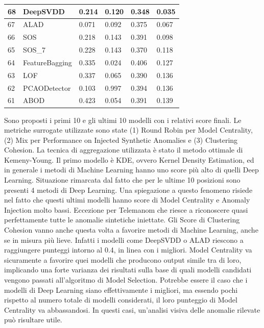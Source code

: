 \begin{table}[H]
\begin{minipage}{.5\textwidth}
{\begin{tabular}{|l|l|l|l|l|l|}
				\hline
				68          & DeepSVDD       & 0.214       & 0.120        & 0.348       & 0.035            \\ 
				\hline
				67          & ALAD           & 0.071       & 0.092        & 0.375       & 0.067            \\ 
				\hline
				66          & SOS            & 0.218       & 0.143        & 0.391       & 0.098            \\ 
				\hline
				65          & SOS\_7         & 0.228       & 0.143        & 0.370       & 0.118            \\ 
				\hline
				64          & FeatureBagging & 0.335       & 0.024        & 0.406       & 0.127            \\ 
				\hline
				63          & LOF            & 0.337       & 0.065        & 0.390       & 0.136            \\ 
				\hline
				62          & PCAODetector   & 0.103       & 0.997        & 0.394       & 0.136            \\ 
				\hline
				61          & ABOD           & 0.423       & 0.054        & 0.391       & 0.139            \\
				\hline
			\end{tabular}}
	\end{minipage}
\end{table}




Sono proposti i primi 10 e gli ultimi 10 modelli con i relativi score finali. Le metriche surrogate utilizzate sono state (1) Round Robin per Model Centrality, (2) Mix per Performance on Injected Synthetic Anomalies e (3) Clustering Cohesion. La tecnica di aggregazione utilizzata è stato il metodo ottimale di Kemeny-Young.
Il primo modello è KDE, ovvero Kernel Density Estimation, ed in generale i metodi di Machine Learning hanno uno score più alto di quelli Deep Learning. Situazione rimarcata dal fatto che per le ultime 10 posizioni sono presenti 4 metodi di Deep Learning. Una spiegazione a questo fenomeno risiede nel fatto che questi ultimi modelli hanno score di Model Centrality e Anomaly Injection molto bassi. Eccezione per Telemanom che riesce a riconoscere quasi perfettamente tutte le anomalie sintetiche iniettate. Gli Score di Clustering Cohesion vanno anche questa volta a favorire metodi di Machine Learning, anche se in misura più lieve. Infatti i modelli come DeepSVDD o ALAD riescono a  raggiungere punteggi intorno al 0.4, in linea con i migliori.
Model Centrality va sicuramente a favorire quei modelli che producono output simile tra di loro, implicando una forte varianza dei risultati sulla base di quali modelli candidati vengono passati all'algoritmo di Model Selection. Potrebbe essere il caso che i modelli di Deep Learning siano effettivamente i migliori, ma essendo pochi rispetto al numero totale di modelli considerati, il loro punteggio di Model Centrality va abbassandosi. In questi casi, un'analisi visiva delle anomalie rilevate può risultare utile.

